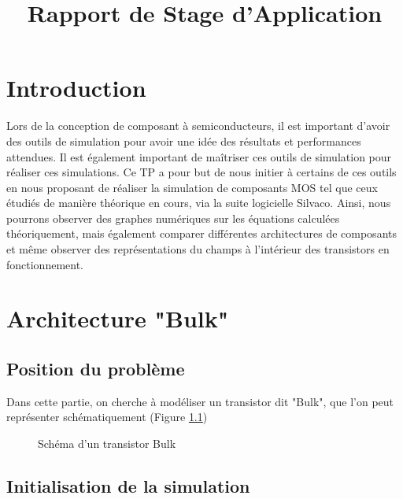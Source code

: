 \documentclass[a4paper,11pt]{report}
\title{Rapport de Stage d'Application}
\begin{document}


\chapter*{Introduction}
Lors de la conception de composant à semiconducteurs, il est important d'avoir des outils de simulation pour avoir une idée des résultats et performances attendues. Il est également important de maîtriser ces outils de simulation pour réaliser ces simulations. Ce TP a pour but de nous initier à certains de ces outils en nous proposant de réaliser la simulation de composants MOS tel que ceux étudiés de manière théorique en cours, via la suite logicielle Silvaco. Ainsi, nous pourrons observer des graphes numériques sur les équations calculées théoriquement, mais également comparer différentes architectures de composants et même observer des représentations du champs à l'intérieur des transistors en fonctionnement.

\chapter{Architecture "Bulk"}

\section{Position du problème}
Dans cette partie, on cherche à modéliser un transistor dit "Bulk", que l'on peut représenter schématiquement (Figure \ref{SchemaBulk})
\begin{figure}[H]
    \centering
    \caption{Schéma d'un transistor Bulk}
    \label{SchemaBulk}
\end{figure}
\section{Initialisation de la simulation}
\end{document}
